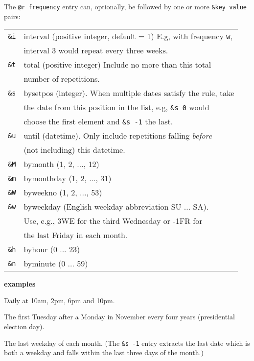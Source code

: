 \documentclass[9pt,landscape]{article}
\begin{document}
\begin{multicols}{3}
\vskip 3pt
The \verb!@r frequency! entry can, optionally, be followed by one or more
\verb!&key value! pairs:
\vskip 3pt

\begin{tabular}{@{}ll@{}}
\texttt{\&i} & interval (positive integer, default = 1) E.g, with frequency \verb!w!, \\
             & interval 3 would repeat every three weeks. \\
\texttt{\&t} & total (positive integer) Include no more than this total \\
             & number of repetitions. \\
\texttt{\&s} & bysetpos (integer). When multiple dates satisfy the rule, take \\
             & the date from this position in the list, e.g, \verb!&s 0! would\\
             & choose the first element and \verb!&s -1! the last. \\
\texttt{\&u} & until (datetime). Only include repetitions falling \emph{before} \\
             & (not including) this datetime. \\
\texttt{\&M} & bymonth (1, 2, ..., 12) \\
\texttt{\&m} & bymonthday (1, 2, ..., 31) \\
\texttt{\&W} & byweekno (1, 2, ..., 53) \\
\texttt{\&w} & byweekday (English weekday abbreviation SU ... SA). \\
             & Use, e.g., 3WE for the third Wednesday or -1FR for \\
             & the last Friday in each month. \\
\texttt{\&h} & byhour (0 ... 23) \\
\texttt{\&n} & byminute (0 ... 59) \\
\end{tabular}

\vskip 4pt
\textbf{examples}
\vskip 3pt

\begin{compactdesc}
  \item[\texttt{@r d \&h 10, 14 18, 22}:]
    Daily at 10am, 2pm, 6pm and 10pm.
  \item[\texttt{@r y \&i 4 \&M 11 \&m range(2,9) \&w TU}:]
    The first Tuesday after a Monday in November every four years (presidential election day).
  \item[\texttt{@r m \&w MO, TU, WE, TH, FR \&m -1, -2, -3 \&s -1}:]
    The last weekday of each month. (The \verb!&s -1! entry extracts the last date which is both a weekday and falls within the last three days of the month.)
\end{compactdesc}


\end{multicols}
\end{document}
